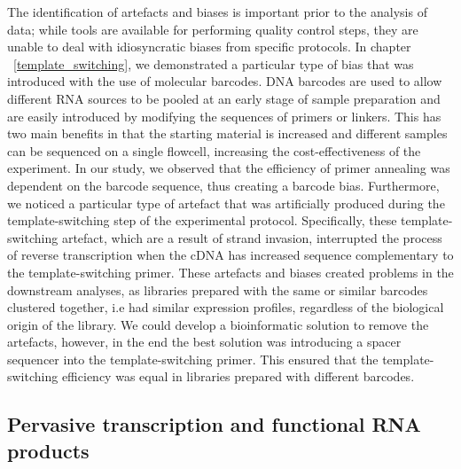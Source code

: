 The identification of artefacts and biases is important prior to the analysis of data; while tools \citep{pmid19737799} are available for performing quality control steps, they are unable to deal with idiosyncratic biases from specific protocols. In chapter ~\ref{template_switching}, we demonstrated a particular type of bias that was introduced with the use of molecular barcodes. DNA barcodes are used to allow different RNA sources to be pooled at an early stage of sample preparation and are easily introduced by modifying the sequences of primers or linkers. This has two main benefits in that the starting material is increased and different samples can be sequenced on a single flowcell, increasing the cost-effectiveness of the experiment. In our study, we observed that the efficiency of primer annealing was dependent on the barcode sequence, thus creating a barcode bias. Furthermore, we noticed a particular type of artefact that was artificially produced during the template-switching step of the experimental protocol. Specifically, these template-switching artefact, which are a result of strand invasion, interrupted the process of reverse transcription when the cDNA has increased sequence complementary to the template-switching primer. These artefacts and biases created problems in the downstream analyses, as libraries prepared with the same or similar barcodes clustered together, i.e had similar expression profiles, regardless of the biological origin of the library. We could develop a bioinformatic solution to remove the artefacts, however, in the end the best solution was introducing a spacer sequencer into the template-switching primer. This ensured that the template-switching efficiency was equal in libraries prepared with different barcodes.

\subsection{Pervasive transcription and functional RNA products}

